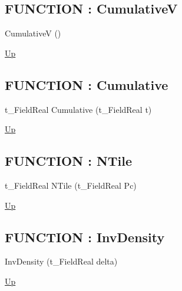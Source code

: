 \par
\par
\subsection*{FUNCTION : CumulativeV}
\hypertarget{ecldoc:linearregression.ols.distributionbase.cumulativev}{}
\begin{minipage}[t]{\textwidth}
\begin{flushleft}
 CumulativeV ()
\end{flushleft}
\end{minipage}
\hyperlink{ecldoc:linearregression.ols.distributionbase}{Up}

\par
\par
\subsection*{FUNCTION : Cumulative}
\hypertarget{ecldoc:linearregression.ols.distributionbase.cumulative}{}
\begin{minipage}[t]{\textwidth}
\begin{flushleft}
t\_FieldReal Cumulative (t\_FieldReal t)
\end{flushleft}
\end{minipage}
\hyperlink{ecldoc:linearregression.ols.distributionbase}{Up}

\par
\par
\subsection*{FUNCTION : NTile}
\hypertarget{ecldoc:linearregression.ols.distributionbase.ntile}{}
\begin{minipage}[t]{\textwidth}
\begin{flushleft}
t\_FieldReal NTile (t\_FieldReal Pc)
\end{flushleft}
\end{minipage}
\hyperlink{ecldoc:linearregression.ols.distributionbase}{Up}

\par
\par
\subsection*{FUNCTION : InvDensity}
\hypertarget{ecldoc:linearregression.ols.distributionbase.invdensity}{}
\begin{minipage}[t]{\textwidth}
\begin{flushleft}
 InvDensity (t\_FieldReal delta)
\end{flushleft}
\end{minipage}
\hyperlink{ecldoc:linearregression.ols.distributionbase}{Up}


